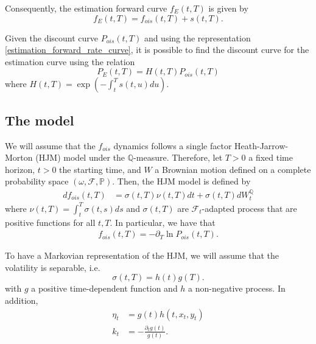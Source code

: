 \documentclass[a4paper,10pt]{article}
\newcommand{\1}{\mathbf{1}}
\begin{document}
Consequently, the estimation forward curve $f_{E}(t, T)$ is given by
\begin{equation}\label{estimation_forward_rate_curve}
f_{E}(t,T) = f_{ois}(t,T) + s(t,T).
\end{equation}

Given the discount curve $P_{ois}(t,T)$ and using the representation \eqref{estimation_forward_rate_curve}, it is possible to find the discount curve for the estimation curve using the relation
\begin{equation}\label{bond_forward}
P_{E}(t,T)=H(t,T)P_{ois}(t,T)
\end{equation}
where $H(t,T)=\exp\left(-\int_{t}^{T}s(t,u) du \right)$.

\subsection{The model}
We will assume that the $f_{ois}$ dynamics follows a single factor Heath-Jarrow-Morton (HJM) model under the $\mathbb{Q}$-measure. Therefore, let $T>0$ a fixed time horizon, $t>0$ the starting time, and $W$ a Brownian motion defined on a complete probability space $(\omega, \mathcal{F}, \mathbb{P})$. Then, the HJM model is defined by
\begin{align}\label{ois_forward_rate_curve}
df_{ois}(t,T) &= \sigma(t,T)\nu(t,T)dt + \sigma(t,T)dW^{\mathbb{Q}}_t
\end{align}
where $\nu(t,T)=\int_{t}^{T}\sigma(t,s)ds$ and $\sigma(t, T)$ are $\mathcal{F}_{t}$-adapted process that are positive functions for all $t,T$. In particular, we have that
\begin{eqnarray*}
f_{ois}(t,T)= -\partial_{T}\ln P_{ois}(t,T).
\end{eqnarray*}

To have a Markovian representation of the HJM, we will assume that the volatility is separable, i.e.
\begin{equation}\label{separation_condition}
\sigma(t,T)= h(t)g(T).
\end{equation}
with $g$ a positive time-dependent function and $h$ a non-negative process. In addition,
\begin{align*}
\eta_t &= g(t)h(t,x_t,y_t)  \nonumber \\
k_t &= - \frac{\partial_t g(t)}{g(t)}.
\end{align*}
\end{document}
